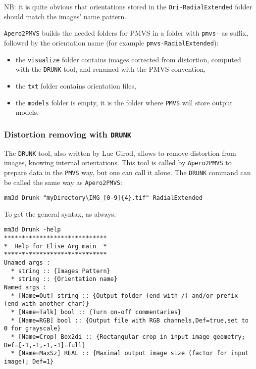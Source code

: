 \vspace{\baselineskip}
NB: it is quite obvious that orientations stored in the {\tt Ori-RadialExtended} folder should match the images' name pattern.

\vspace{\baselineskip}
{\tt Apero2PMVS} builds the needed folders for PMVS in a folder with {\tt pmvs-} as suffix, followed by the orientation name (for example {\tt pmvs-RadialExtended}):
\begin{itemize}
     \item the {\tt visualize} folder contains images corrected from distortion, computed with the {\tt DRUNK} tool, and renamed with the PMVS convention,
     \item the {\tt txt} folder contains orientation files,
     \item the {\tt models} folder is empty, it is the folder where {\tt PMVS} will store output models.
\end{itemize}

\subsubsection{Distortion removing with {\tt DRUNK} }

The {\tt DRUNK} tool, also written by Luc Girod, allows to remove distortion from images, knowing internal orientations. This tool is called by {\tt Apero2PMVS} to prepare data in the {\tt PMVS} way, but one can call it alone. The {\tt DRUNK} command can be called the same way as {\tt Apero2PMVS}:

\begin{verbatim}
mm3d Drunk "myDirectory\IMG_[0-9]{4}.tif" RadialExtended
\end{verbatim}

To get the general syntax, as always:

\begin{verbatim}
mm3d Drunk -help
*****************************
*  Help for Elise Arg main  *
*****************************
Unamed args :
  * string :: {Images Pattern}
  * string :: {Orientation name}
Named args :
  * [Name=Out] string :: {Output folder (end with /) and/or prefix (end with another char)}
  * [Name=Talk] bool :: {Turn on-off commentaries}
  * [Name=RGB] bool :: {Output file with RGB channels,Def=true,set to 0 for grayscale}
  * [Name=Crop] Box2di :: {Rectangular crop in input image geometry; Def=[-1,-1,-1,-1]=full}
  * [Name=MaxSz] REAL :: {Maximal output image size (factor for input image); Def=1}

\end{verbatim}

